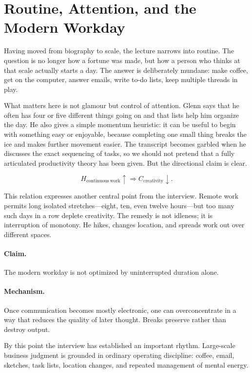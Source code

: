 \section{Routine, Attention, and the Modern Workday}

Having moved from biography to scale, the lecture narrows into routine. The question is no longer how a fortune was made, but how a person who thinks at that scale actually starts a day. The answer is deliberately mundane: make coffee, get on the computer, answer emails, write to-do lists, keep multiple threads in play.

What matters here is not glamour but control of attention. Glenn says that he often has four or five different things going on and that lists help him organize the day. He also gives a simple momentum heuristic: it can be useful to begin with something easy or enjoyable, because completing one small thing breaks the ice and makes further movement easier. The transcript becomes garbled when he discusses the exact sequencing of tasks, so we should not pretend that a fully articulated productivity theory has been given. But the directional claim is clear.

\begin{equation}
H_{\mathrm{continuous\ work}}\uparrow \Longrightarrow C_{\mathrm{creativity}}\downarrow.
\end{equation}

This relation expresses another central point from the interview. Remote work permits long isolated stretches---eight, ten, even twelve hours---but too many such days in a row deplete creativity. The remedy is not idleness; it is interruption of monotony. He hikes, changes location, and spreads work out over different spaces.

\paragraph{Claim.} The modern workday is not optimized by uninterrupted duration alone.

\paragraph{Mechanism.} Once communication becomes mostly electronic, one can overconcentrate in a way that reduces the quality of later thought. Breaks preserve rather than destroy output.

By this point the interview has established an important rhythm. Large-scale business judgment is grounded in ordinary operating discipline: coffee, email, sketches, task lists, location changes, and repeated management of mental energy.


